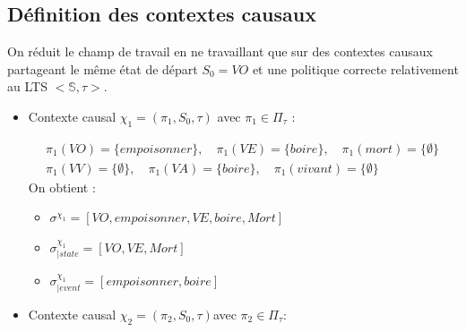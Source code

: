 \subsection{Définition des contextes causaux}
On réduit le champ de travail en ne travaillant que sur des contextes causaux partageant le même état de départ $S_0 = VO$ et une politique correcte relativement au LTS $<\mathds{S},\tau>$.
\begin{itemize}
\item Contexte causal  $\chi_1 = (\pi_1,S_0,\tau)$ avec $\pi_1\in \Pi_\tau$ :


    \begin{minipage}{0.45\textwidth}
        \begin{align*}
            &\pi_1(VO)= \{empoisonner\}, \quad \pi_1(VE)= \{boire\}, \quad \pi_1(mort)=\{\emptyset\} \quad \\ 
            &\pi_1(VV) = \{\emptyset\},\quad \pi_1(VA) = \{boire\},\quad \pi_1(vivant)=\{\emptyset\}
        \end{align*}
        On obtient :
    \begin{itemize}
        \item $\sigma^{\chi_1}= [VO,empoisonner,VE,boire, Mort]$
        \item $\sigma^{\chi_1}_{|state}=[VO,VE,Mort]$
        \item $\sigma^{\chi_1}_{|event}=[empoisonner,boire]$
    \end{itemize}
    \end{minipage}   
    \hfill
    \begin{minipage}{0.45\textwidth}

    \end{minipage}


    \item Contexte causal $\chi_2 = (\pi_2,S_0,\tau)$avec $\pi_2\in \Pi_\tau:$


\end{itemize}
